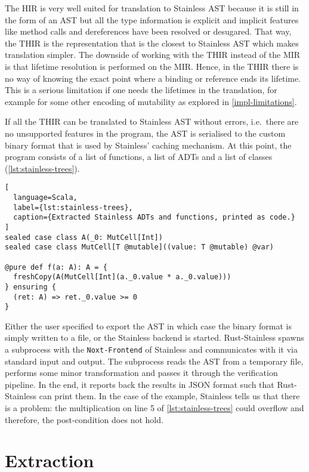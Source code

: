 The HIR is very well suited for translation to Stainless AST because it is still
in the form of an AST but all the type information is explicit and implicit
features like method calls and dereferences have been resolved or desugared.
That way, the THIR is the representation that is the closest to Stainless AST
which makes translation simpler. The downside of working with the THIR instead
of the MIR is that lifetime resolution is performed on the MIR. Hence, in the
THIR there is no way of knowing the exact point where a binding or reference
ends its lifetime. This is a serious limitation if one needs the lifetimes in
the translation, for example for some other encoding of mutability as explored
in \autoref{impl-limitations}.


If all the THIR can be translated to Stainless AST without errors,
i.e.~there are no unsupported features in the program, the AST is
serialised to the custom binary format that is used by Stainless'
caching mechanism. At this point, the program consists of a list of
functions, a list of ADTs and a list of classes (\autoref{lst:stainless-trees}).

\begin{lstlisting}[
  language=Scala,
  label={lst:stainless-trees},
  caption={Extracted Stainless ADTs and functions, printed as code.}
]
sealed case class A(_0: MutCell[Int])
sealed case class MutCell[T @mutable]((value: T @mutable) @var)

@pure def f(a: A): A = {
  freshCopy(A(MutCell[Int](a._0.value * a._0.value)))
} ensuring {
  (ret: A) => ret._0.value >= 0
}
\end{lstlisting}

Either the user specified to export the AST in which case the binary format is
simply written to a file, or the Stainless backend is started. Rust-Stainless
spawns a subprocess with the \passthrough{\lstinline!Noxt-Frontend!} of
Stainless and communicates with it via standard input and output. The subprocess
reads the AST from a temporary file, performs some minor transformation and
passes it through the verification pipeline. In the end, it reports back the
results in JSON format such that Rust-Stainless can print them. In the case of
the example, Stainless tells us that there is a problem: the multiplication on
line 5 of \autoref{lst:stainless-trees} could overflow and therefore, the
post-condition does not hold.



\section{Extraction}

